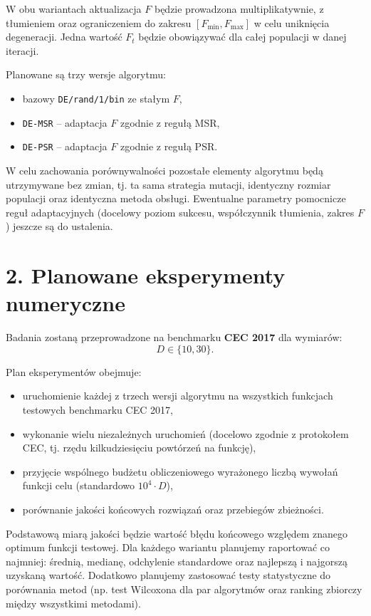 \documentclass[11pt,a4paper]{article}
\begin{document}
W obu wariantach aktualizacja $F$ będzie prowadzona multiplikatywnie, z tłumieniem oraz ograniczeniem do zakresu $[F_{\min}, F_{\max}]$ w celu uniknięcia degeneracji. Jedna wartość $F_t$ będzie obowiązywać dla całej populacji w danej iteracji.

Planowane są trzy wersje algorytmu:
\begin{itemize}
    \item bazowy \texttt{DE/rand/1/bin} ze stałym $F$,
    \item \texttt{DE-MSR} -- adaptacja $F$ zgodnie z regułą MSR,
    \item \texttt{DE-PSR} -- adaptacja $F$ zgodnie z regułą PSR.
\end{itemize}

W celu zachowania porównywalności pozostałe elementy algorytmu będą utrzymywane bez zmian, tj. ta sama strategia mutacji, identyczny rozmiar populacji oraz identyczna metoda obsługi. Ewentualne parametry pomocnicze reguł adaptacyjnych (docelowy poziom sukcesu, współczynnik tłumienia, zakres $F$) jeszcze są do ustalenia.

\section*{2. Planowane eksperymenty numeryczne}

Badania zostaną przeprowadzone na benchmarku \textbf{CEC 2017} dla wymiarów:
\[
D \in \{10, 30\}.
\]

Plan eksperymentów obejmuje:
\begin{itemize}
    \item uruchomienie każdej z trzech wersji algorytmu na wszystkich funkcjach testowych benchmarku CEC 2017,
    \item wykonanie wielu niezależnych uruchomień (docelowo zgodnie z protokołem CEC, tj. rzędu kilkudziesięciu powtórzeń na funkcję),
    \item przyjęcie wspólnego budżetu obliczeniowego wyrażonego liczbą wywołań funkcji celu (standardowo $10^4 \cdot D$),
    \item porównanie jakości końcowych rozwiązań oraz przebiegów zbieżności.
\end{itemize}

Podstawową miarą jakości będzie wartość błędu końcowego względem znanego optimum funkcji testowej. Dla każdego wariantu planujemy raportować co najmniej: średnią, medianę, odchylenie standardowe oraz najlepszą i najgorszą uzyskaną wartość. Dodatkowo planujemy zastosować testy statystyczne do porównania metod (np. test Wilcoxona dla par algorytmów oraz ranking zbiorczy między wszystkimi metodami).
\end{document}
